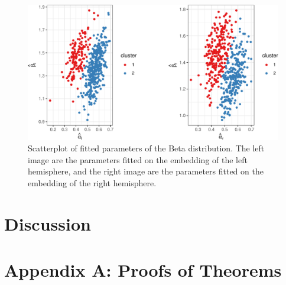\documentclass[12pt]{article}
\begin{document}
\begin{figure}[H]

{\centering \includegraphics{draft_files/figure-latex/hcp-clustering-1} 

}

\caption{Scatterplot of fitted parameters of the Beta distribution. The left image are the parameters fitted on the embedding of the left hemisphere, and the right image are the parameters fitted on the embedding of the right hemisphere.}\label{fig:hcp-clustering}
\end{figure}

\hypertarget{discussion}{%
\section{Discussion}\label{discussion}}

\section*{Appendix A: Proofs of Theorems}

\newpage


\renewcommand\refname{Bibliography}

\end{document}
